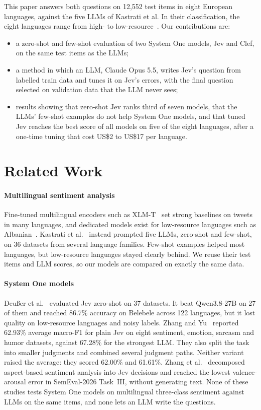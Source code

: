 \documentclass[sigconf]{acmart}
\begin{document}
This paper answers both questions on 12,552 test items in eight European languages, against the five LLMs of Kastrati et al. In their classification, the eight languages range from high- to low-resource~\cite{kastrati2026language}. Our contributions are:
\begin{itemize}
\item a zero-shot and few-shot evaluation of two System One models, Jev and Clef, on the same test items as the LLMs;
\item a method in which an LLM, Claude Opus 5.5, writes Jev's question from labelled train data and tunes it on Jev's errors, with the final question selected on validation data that the LLM never sees;
\item results showing that zero-shot Jev ranks third of seven models, that the LLMs' few-shot examples do not help System One models, and that tuned Jev reaches the best score of all models on five of the eight languages, after a one-time tuning that cost US\$2 to US\$17 per language.
\end{itemize}

\section{Related Work}
\paragraph{Multilingual sentiment analysis}
Fine-tuned multilingual encoders such as XLM-T~\cite{barbieri2022xlmt} set strong baselines on tweets in many languages, and dedicated models exist for low-resource languages such as Albanian~\cite{kastrati2021albana}. Kastrati et al.~\cite{kastrati2026language} instead prompted five LLMs, zero-shot and few-shot, on 36 datasets from several language families. Few-shot examples helped most languages, but low-resource languages stayed clearly behind. We reuse their test items and LLM scores, so our models are compared on exactly the same data.

\paragraph{System One models}
Deußer et al.~\cite{deusser2026jev} evaluated Jev zero-shot on 37 datasets. It beat Qwen3.8-27B on 27 of them and reached 86.7\% accuracy on Belebele across 122 languages, but it lost quality on low-resource languages and noisy labels. Zhang and Yu~\cite{zhang2026emojev} reported 62.93\% average macro-F1 for plain Jev on eight sentiment, emotion, sarcasm and humor datasets, against 67.28\% for the strongest LLM. They also split the task into smaller judgments and combined several judgment paths. Neither variant raised the average: they scored 62.00\% and 61.61\%. Zhang et al.~\cite{zhang2026decide} decomposed aspect-based sentiment analysis into Jev decisions and reached the lowest valence-arousal error in SemEval-2026 Task~III, without generating text. None of these studies tests System One models on multilingual three-class sentiment against LLMs on the same items, and none lets an LLM write the questions.
\end{document}
